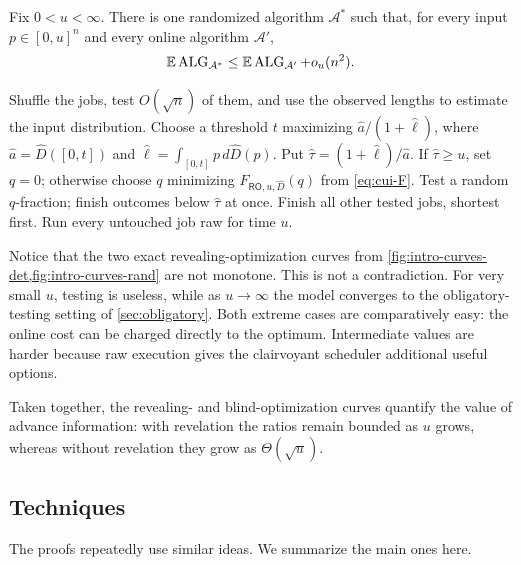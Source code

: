 \begin{theorem}
\label{thm:intro-common-upper-instance}
Fix $0<u<\infty$.  There is one randomized algorithm $\mathcal A^*$ such that,
for every input $p\in[0,u]^n$ and every online algorithm
$\mathcal A'$,
\[
 \mathbb{E}\operatorname{ALG}_{\mathcal A^*}\le \mathbb{E}\operatorname{ALG}_{\mathcal A'}+o_u(n^2).
\]

\end{theorem}


\begin{algorithm}[H]
\caption{}
\label{alg:intro-common-upper}
\begin{algorithmic}
\State Shuffle the jobs, test $O(\sqrt n)$ of them, and use the
observed lengths to estimate the input distribution.
\State Choose a threshold $t$ maximizing
$\widehat a/(1+\widehat\ell)$, where
$\widehat a=\widehat D([0,t])$ and
$\widehat\ell=\int_{[0,t]}p\,d\widehat D(p)$.
\State Put $\widehat\tau=(1+\widehat\ell)/\widehat a$.  If
$\widehat\tau\ge u$, set $q=0$; otherwise choose $q$ minimizing
$F_{\mathsf{RO},u,\widehat D}(q)$ from \cref{eq:cui-F}.
\State Test a random $q$-fraction; finish outcomes below
$\widehat\tau$ at once.
\State Finish all other tested jobs, shortest first.
\State Run every untouched job raw for time $u$.
\end{algorithmic}
\end{algorithm}

Notice that the two exact revealing-optimization curves from \cref{fig:intro-curves-det,fig:intro-curves-rand} are not monotone.
This is not a contradiction.  For very small $u$, testing is
useless, while as $u\to\infty$ the model converges to the obligatory-testing
setting of \cref{sec:obligatory}.  Both extreme cases are comparatively easy:
the online cost can be charged directly to the optimum.  Intermediate values
are harder because raw execution gives the clairvoyant scheduler additional
useful options.

Taken together, the revealing- and blind-optimization curves
quantify the value of advance information: with revelation the ratios remain
bounded as $u$ grows, whereas without revelation they grow as
$\Theta(\sqrt u)$.


\subsection{Techniques}

The proofs repeatedly use similar ideas.  We summarize the main ones here.

